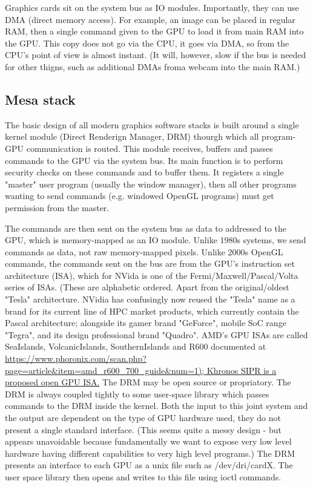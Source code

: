 \documentclass[oneside,english]{scrbook}
\begin{document}
Graphics cards sit on the system bus as IO modules.  Importantly, they can use DMA (direct memory access).  For example, an image can be placed in regular RAM, then a single command given to the GPU to load it from main RAM into the GPU.  This copy does not go via the CPU, it goes via DMA, so from the CPU's point of view is almost instant.  (It will, however, slow if the bus is needed for other thigns, such as additional DMAs froma  webcam into the main RAM.)

\subsection{Mesa stack}

The basic design of all modern graphics software stacks is built around a single kernel module (Direct Renderign Manager, DRM) thourgh which all program-GPU communication is routed. This module receives, buffers and passes commands to the GPU via the system bus. Its main function is to perform security checks on these commands and to buffer them.  It registers a single "master" user program (usually the window manager), then all other programs wanting to send commands (e.g. windowed OpenGL programs) must get permission from the master.    

The commands are then sent on the system bus as data to addressed to the GPU, which is memory-mapped as an IO module.  Unlike 1980s systems, we send commands as data, not raw memory-mapped pixels.  Unlike 2000s OpenGL commands, the commands sent on the bus are from the GPU's instruction set architecture (ISA), which for NVida is one of the Fermi/Maxwell/Pascal/Volta series of ISAs. (These are alphabetic ordered. Apart from the original/oldest "Tesla" architecture. NVidia has confusingly now reused the "Tesla" name as a brand for its current line of HPC market products, which currently contain the Pascal architecture; alongside its gamer brand "GeForce", mobile SoC range "Tegra", and its design professional brand "Quadro".   AMD's GPU ISAs are called SeaIslands, VolcanicIslands, SouthernIslands and R600 documented at \url{https://www.phoronix.com/scan.php?page=article&item=amd_r600_700_guide&num=1); Khronos SIPR is a proposed open GPU ISA.} The DRM may be open source or propriatory.  The DRM is always coupled tightly to some user-space library which passes commands to the DRM inside the kernel.  Both the input to this joint system and the output are dependent on the type of GPU hardware used, they do not present a single standard interface. (This seems quite a messy design - but appears unavoidable because fundamentally we want to expose very low level hardware having different capabilities to very high level programs.)  The DRM presents an interface to each GPU as a unix file such as /dev/dri/cardX.  The user space library then opens and writes to this file using ioctl commands.
\end{document}
